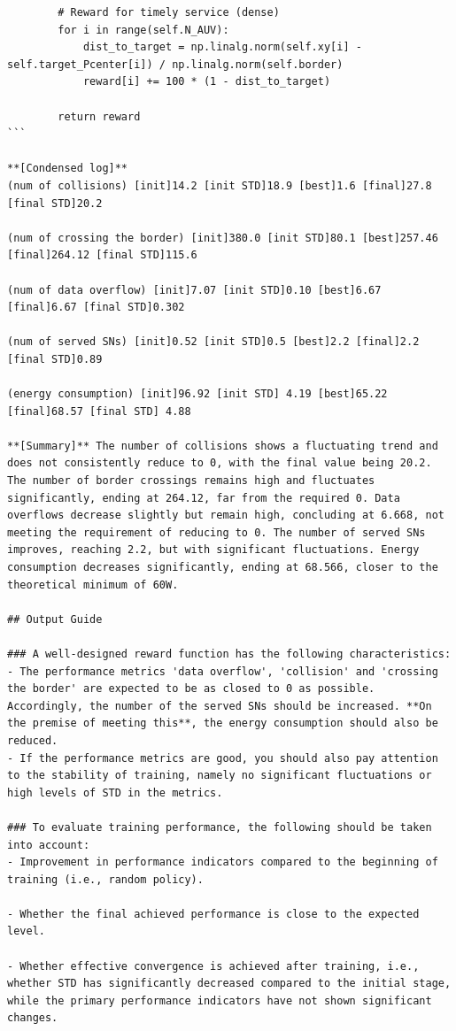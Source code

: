 \documentclass{article}
\begin{document}
\begin{verbatim}
        # Reward for timely service (dense)
        for i in range(self.N_AUV):
            dist_to_target = np.linalg.norm(self.xy[i] - self.target_Pcenter[i]) / np.linalg.norm(self.border)
            reward[i] += 100 * (1 - dist_to_target)
        
        return reward
```

**[Condensed log]**  
(num of collisions) [init]14.2 [init STD]18.9 [best]1.6 [final]27.8 [final STD]20.2

(num of crossing the border) [init]380.0 [init STD]80.1 [best]257.46 [final]264.12 [final STD]115.6

(num of data overflow) [init]7.07 [init STD]0.10 [best]6.67 [final]6.67 [final STD]0.302

(num of served SNs) [init]0.52 [init STD]0.5 [best]2.2 [final]2.2 [final STD]0.89

(energy consumption) [init]96.92 [init STD] 4.19 [best]65.22 [final]68.57 [final STD] 4.88

**[Summary]** The number of collisions shows a fluctuating trend and does not consistently reduce to 0, with the final value being 20.2. The number of border crossings remains high and fluctuates significantly, ending at 264.12, far from the required 0. Data overflows decrease slightly but remain high, concluding at 6.668, not meeting the requirement of reducing to 0. The number of served SNs improves, reaching 2.2, but with significant fluctuations. Energy consumption decreases significantly, ending at 68.566, closer to the theoretical minimum of 60W. 

## Output Guide

### A well-designed reward function has the following characteristics:
- The performance metrics 'data overflow', 'collision' and 'crossing the border' are expected to be as closed to 0 as possible. Accordingly, the number of the served SNs should be increased. **On the premise of meeting this**, the energy consumption should also be reduced.
- If the performance metrics are good, you should also pay attention to the stability of training, namely no significant fluctuations or high levels of STD in the metrics.

### To evaluate training performance, the following should be taken into account:
- Improvement in performance indicators compared to the beginning of training (i.e., random policy). 

- Whether the final achieved performance is close to the expected level. 

- Whether effective convergence is achieved after training, i.e., whether STD has significantly decreased compared to the initial stage, while the primary performance indicators have not shown significant changes.


\end{verbatim}
\end{document}
